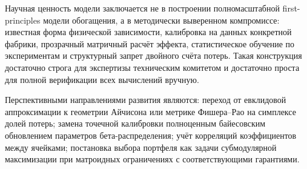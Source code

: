 \documentclass[12pt,a4paper]{article}
\begin{document}
Научная ценность модели заключается не в построении полномасштабной
first-principles модели обогащения, а в методически выверенном компромиссе:
известная форма физической зависимости, калибровка на данных конкретной
фабрики, прозрачный матричный расчёт эффекта, статистическое обучение по
экспериментам и структурный запрет двойного счёта потерь. Такая конструкция
достаточно строга для экспертизы техническим комитетом и достаточно проста
для полной верификации всех вычислений вручную.

Перспективными направлениями развития являются: переход от евклидовой
аппроксимации к геометрии Айчисона или метрике Фишера--Рао на симплексе
долей потерь; замена точечной калибровки полноценным байесовским обновлением
параметров бета-распределения; учёт корреляций коэффициентов между ячейками;
постановка выбора портфеля как задачи субмодулярной максимизации при
матроидных ограничениях с соответствующими гарантиями.
\end{document}
